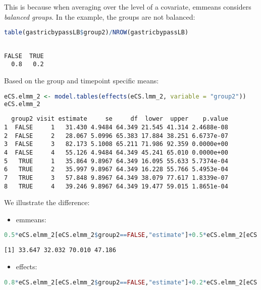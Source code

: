 \documentclass[12pt]{article}
\begin{document}
This is because when averaging over the level of a covariate, emmeans
considers \emph{balanced groups}. In the example, the groups are not
balanced:
\begin{lstlisting}[language=r,numbers=none]
table(gastricbypassLB$group2)/NROW(gastricbypassLB)
\end{lstlisting}

\label{}
\begin{verbatim}

FALSE  TRUE 
  0.8   0.2
\end{verbatim}


Based on the group and timepoint specific means:
\begin{lstlisting}[language=r,numbers=none]
eCS.elmm_2 <- model.tables(effects(eCS.lmm_2, variable = "group2"))
eCS.elmm_2
\end{lstlisting}

\label{}
\begin{verbatim}
  group2 visit estimate     se     df  lower  upper    p.value
1  FALSE     1   31.430 4.9484 64.349 21.545 41.314 2.4688e-08
2  FALSE     2   28.067 5.0996 65.383 17.884 38.251 6.6737e-07
3  FALSE     3   82.173 5.1008 65.211 71.986 92.359 0.0000e+00
4  FALSE     4   55.126 4.9484 64.349 45.241 65.010 0.0000e+00
5   TRUE     1   35.864 9.8967 64.349 16.095 55.633 5.7374e-04
6   TRUE     2   35.997 9.8967 64.349 16.228 55.766 5.4953e-04
7   TRUE     3   57.848 9.8967 64.349 38.079 77.617 1.8339e-07
8   TRUE     4   39.246 9.8967 64.349 19.477 59.015 1.8651e-04
\end{verbatim}


We illustrate the difference:
\begin{itemize}
\item emmeans:
\end{itemize}
\begin{lstlisting}[language=r,numbers=none]
0.5*eCS.elmm_2[eCS.elmm_2$group2==FALSE,"estimate"]+0.5*eCS.elmm_2[eCS.elmm_2$group2==TRUE,"estimate"]
\end{lstlisting}

\label{}
\begin{verbatim}
[1] 33.647 32.032 70.010 47.186
\end{verbatim}


\begin{itemize}
\item effects:
\end{itemize}
\begin{lstlisting}[language=r,numbers=none]
0.8*eCS.elmm_2[eCS.elmm_2$group2==FALSE,"estimate"]+0.2*eCS.elmm_2[eCS.elmm_2$group2==TRUE,"estimate"]
\end{lstlisting}
\end{document}

